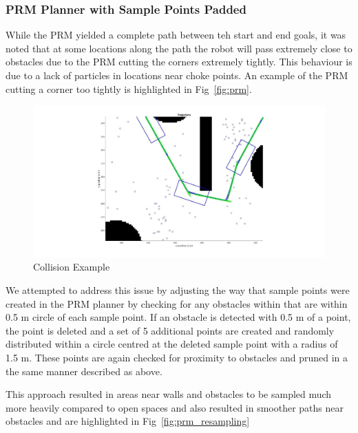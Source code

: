 \documentclass{article}
\begin{document}
\subsubsection{PRM Planner with Sample Points Padded}
\label{subsec:prm_padding}

While the PRM yielded a complete path between teh start and end goals, it was noted that at some locations along the path the robot will pass extremely close to obstacles due to the PRM cutting the corners extremely tightly. This behaviour is due to a lack of particles in locations near choke points. An example of the PRM cutting a corner too tightly is highlighted in  Fig~\ref{fig:prm}. 

\begin{figure}[H]
	\centering
	\includegraphics[width=\linewidth]{images/collision_example.jpg}
	\caption{Collision Example}
	\label{fig:collision_example}
\end{figure}


We attempted to address this issue by adjusting the way that sample points were created in the PRM planner by checking for any obstacles within that are within 0.5 m circle  of each sample point. If an obstacle is detected with 0.5 m of a point, the point is deleted and a set of 5 additional points are created and randomly distributed within a circle centred at the deleted sample point with a radius of 1.5 m. These points are again checked for proximity to obstacles and pruned in a the same manner described as above. 

This approach resulted in areas near walls and obstacles to be sampled much more heavily compared to open spaces and also resulted in smoother paths near obstacles and are highlighted in Fig~\ref{fig:prm_resampling}
\end{document}
